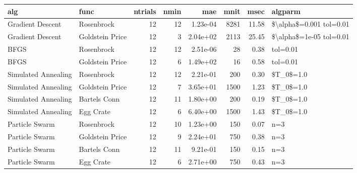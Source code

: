 \begin{tabular}{llrrrrrl}
\toprule
                 alg &             func &  ntrials &  nmin &      mae &  mnit &  msec &                  algparm \\
\midrule
    Gradient Descent &       Rosenbrock &       12 &    12 & 1.23e-04 &  8281 & 11.58 &  \$\textbackslash alpha\$=0.001 tol=0.01 \\
    Gradient Descent &  Goldstein Price &       12 &     3 & 2.04e+02 &  2113 & 25.45 &  \$\textbackslash alpha\$=1e-05 tol=0.01 \\
                BFGS &       Rosenbrock &       12 &    12 & 2.51e-06 &    28 &  0.38 &                 tol=0.01 \\
                BFGS &  Goldstein Price &       12 &     6 & 1.49e+02 &    16 &  0.58 &                 tol=0.01 \\
 Simulated Annealing &       Rosenbrock &       12 &    12 & 2.21e-01 &   200 &  0.30 &                \$T\_0\$=1.0 \\
 Simulated Annealing &  Goldstein Price &       12 &     7 & 3.65e+01 &  1500 &  1.23 &                \$T\_0\$=1.0 \\
 Simulated Annealing &     Bartels Conn &       12 &    11 & 1.80e+00 &   200 &  0.19 &                \$T\_0\$=1.0 \\
 Simulated Annealing &        Egg Crate &       12 &     6 & 6.40e+00 &  1500 &  1.43 &                \$T\_0\$=1.0 \\
      Particle Swarm &       Rosenbrock &       12 &    10 & 1.23e+00 &   150 &  0.07 &                      n=3 \\
      Particle Swarm &  Goldstein Price &       12 &     9 & 2.24e+01 &   750 &  0.38 &                      n=3 \\
      Particle Swarm &     Bartels Conn &       12 &    11 & 9.21e-01 &   150 &  0.15 &                      n=3 \\
      Particle Swarm &        Egg Crate &       12 &     6 & 2.71e+00 &   750 &  0.43 &                      n=3 \\
\bottomrule
\end{tabular}
